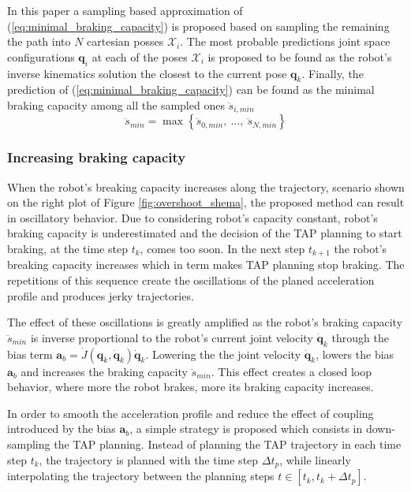 In this paper a sampling based approximation of (\ref{eq:minimal_braking_capacity}) is proposed based on sampling the remaining the path into $N$ cartesian posses $\mathcal{X}_i$. The most probable predictions joint space configurations $\bm{q}_i$ at each of the poses $\mathcal{X}_i$ is proposed to be found as the robot's inverse kinematics solution the closest to the current pose $\bm{q}_k$. Finally, the prediction of (\ref{eq:minimal_braking_capacity}) can be found as the minimal braking capacity among all the sampled ones $\ddot{s}_{i, min}$
\begin{equation}
    \ddot{s}_{min} = \max \left\{\ddot{s}_{0, min},~ \ldots,~ \ddot{s}_{N, min}\right \}
\end{equation}


\subsubsection{Increasing braking capacity}
When the robot's breaking capacity increases along the trajectory, scenario shown on the right plot of Figure \ref{fig:overshoot_shema}, the proposed method can result in oscillatory behavior.  Due to considering robot's capacity constant, robot's braking capacity is underestimated and the decision of the TAP planning to start braking, at the time step $t_k$, comes too soon. In the next step $t_{k+1}$ the robot's breaking capacity increases which in term makes TAP planning stop braking. The repetitions of this sequence create the oscillations of the planed acceleration profile and produces jerky trajectories. 

The effect of these oscillations is greatly amplified as the robot's braking capacity $\ddot{s}_{min}$ is inverse proportional to the robot's current joint velocity $\dot{\bm{q}}_{k}$ through the bias term $\bm{a}_b = \dot{J}(\bm{q}_k,\dot{\bm{q}}_k)\dot{\bm{q}}_k$. Lowering the the joint velocity $\dot{\bm{q}}_{k}$, lowers the bias $\bm{a}_b$ and increases the braking capacity $\ddot{s}_{min}$. This effect creates a closed loop behavior, where more the robot brakes, more its braking capacity increases. 

In order to smooth the acceleration profile and reduce the effect of coupling introduced by the bias $\bm{a}_b$, a simple strategy is proposed which consists in down-sampling the TAP planning. Instead of planning the TAP trajectory in each time step $t_k$, the trajectory is planned with the time step $\Delta t_p$, while linearly interpolating the trajectory between the planning steps $t \in \left[t_k, t_k+\Delta t_p\right]$. 

